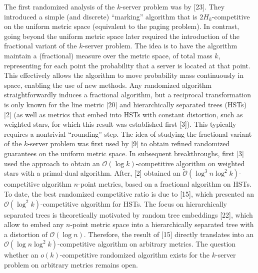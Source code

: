 \documentclass[10pt,a4paper]{article}
\begin{document}
The first randomized analysis of the $k$-server problem was by [23]. They introduced a simple (and discrete) “marking” algorithm that is $2H_{k}$-competitive on the uniform metric space (equivalent to the paging problem). In contrast, going beyond the uniform metric space later required the introduction of the fractional variant of the $k$-server problem. The idea is to have the algorithm maintain a (fractional) measure over the metric space, of total mass $k$, representing for each point the probability that a server is located at that point. This effectively allows the algorithm to move probability mass continuously in space, enabling the use of new methods. Any randomized algorithm straightforwardly induces a fractional algorithm, but a reciprocal transformation is only known for the line metric [20] and hierarchically separated trees (HSTs) [2] (as well as metrics that embed into HSTs with constant distortion, such as weighted stars, for which this result was established first [3]). This typically requires a nontrivial “rounding” step.
The idea of studying the fractional variant of the $k$-server problem was first used by [9] to obtain refined randomized guarantees on the uniform metric space.
In subsequent breakthroughs, first [3] used the approach to obtain an $\mathcal{O}(\log k)$-competitive algorithm on weighted stars with a primal-dual algorithm. After, [2] obtained an $\tilde{\mathcal{O}}(\log^{3}n\log^{2}k)$-competitive algorithm $n$-point metrics, based on a fractional algorithm on HSTs. To date, the best randomized competitive ratio is due to [15], which presented an $\mathcal{O}(\log^{2}k)$-competitive algorithm for HSTs. The focus on hierarchically separated trees is theoretically motivated by random tree embeddings [22], which allow to embed any $n$-point metric space into a hierarchically separated tree with a distortion of $\mathcal{O}(\log n)$. Therefore, the result of [15] directly translates into an $\mathcal{O}(\log n\log^{2}k)$-competitive algorithm on arbitrary metrics. The question whether an $o(k)$-competitive randomized algorithm exists for the $k$-server problem on arbitrary metrics remains open.\par
\end{document}
